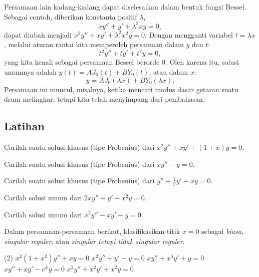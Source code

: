 \begin{example}
Persamaan lain kadang-kadang dapat diselesaikan dalam bentuk fungsi Bessel.
Sebagai contoh, diberikan konstanta positif $\lambda$,
\begin{equation*}
x y'' + y' + \lambda^2 x y = 0 ,
\end{equation*}
dapat diubah menjadi 
$x^2 y'' + x y' + \lambda^2 x^2 y = 0$. Dengan mengganti variabel
$t = \lambda x$, melalui aturan rantai kita memperoleh persamaan dalam $y$ dan $t$:
\begin{equation*}
t^2 y'' + t y' + t^2 y = 0 ,
\end{equation*}
yang kita kenali sebagai persamaan Bessel berorde $0$. Oleh karena itu,
solusi umumnya adalah $y(t) = A J_0(t) + B Y_0(t)$, atau dalam $x$:
\begin{equation*}
y = A J_0(\lambda x) + B Y_0(\lambda x) .
\end{equation*}
Persamaan ini muncul, misalnya, ketika mencari modus dasar
getaran suatu drum melingkar, tetapi kita telah menyimpang dari pembahasan.
\end{example}

\subsection{Latihan}

\begin{exercise}
Carilah suatu solusi khusus (tipe Frobenius) dari $x^2 y'' + x y' + (1+x) y = 0$.
\end{exercise}

\begin{exercise}
Carilah suatu solusi khusus (tipe Frobenius) dari $x y'' - y = 0$.
\end{exercise}

\begin{exercise}
Carilah suatu solusi khusus (tipe Frobenius) dari $y'' +\frac{1}{x}y' - xy = 0$.
\end{exercise}

\begin{exercise}
Carilah solusi umum dari $2 x y'' + y' - x^2 y = 0$.
\end{exercise}

\begin{exercise}
Carilah solusi umum dari $x^2 y'' - x y' -y = 0$.
\end{exercise}

\begin{exercise}
Dalam persamaan-persamaan berikut,
klasifikasikan titik $x=0$ sebagai \emph{biasa}, \emph{singular reguler}, atau
\emph{singular tetapi tidak singular reguler}.
\begin{tasks}(2)
\task $x^2(1+x^2)y''+xy=0$
\task $x^2y''+y'+y=0$
\task $xy''+x^3y'+y=0$
\task $xy''+xy'-e^xy=0$
\task $x^2y''+x^2y'+x^2y=0$
\end{tasks}
\end{exercise}

